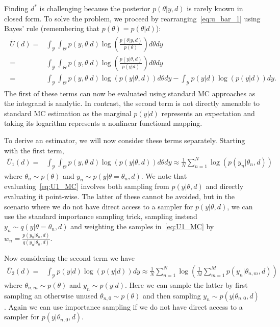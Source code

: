 Finding $d^*$ is challenging because the posterior $p(\theta |y, d)$ is rarely known in closed form.  
To solve the problem, we proceed by rearranging~\eqref{eq:u_bar_1} using Bayes' rule (remembering that
$p(\theta)=p(\theta|d)$):
\begin{align}
\label{eq:u_bar_2}
\begin{split}
\bar{U}(d) = & \int_{\mathcal{Y}}\int_{\Theta} p(y,\theta | d) \log\left(\frac{p(\theta | y, d)}{p(\theta)}\right) d\theta dy \\
=& \int_{\mathcal{Y}}\int_{\Theta} p(y,\theta | d) \log\left(\frac{p(y | \theta, d)}{p(y |d)}\right) d\theta dy \\
=&\int_{\mathcal{Y}}\int_{\Theta} p(y,\theta | d) \log(p(y | \theta, d)) d\theta dy - \int_{\mathcal{Y}} p(y | d) \log(p(y | d))dy.
\end{split}
\end{align}
The first of these terms can now be evaluated using standard MC approaches as the integrand is analytic.  
In contrast, the second term is not directly amenable to standard MC estimation
as the marginal $p(y|d)$ represents an expectation
and taking its logarithm represents a nonlinear functional mapping.  

To derive an estimator, we will now consider these terms separately.  Starting
with the first term,
\begin{align}
\bar{U}_1(d) = &\int_{\mathcal{Y}}\int_{\Theta} p(y,\theta | d) \log(p(y | \theta, d)) d\theta dy
\approx \frac{1}{N} \sum_{n=1}^{N} \log(p(y_n | \theta_n, d)) \label{eq:U1_MC}
\end{align}
where $\theta_n \sim p(\theta)$ and $y_n \sim p(y|\theta=\theta_n, d)$.  We
note that evaluating~\eqref{eq:U1_MC} involves both
sampling from $p(y | \theta, d)$ and directly evaluating it point-wise.
The latter of these cannot be avoided, but in the scenario where we
do not have direct access to a sampler for $p(y | \theta, d)$, we can
use the standard importance sampling trick, sampling instead
$y_n \sim q(y|\theta=\theta_n, d)$ and weighting the samples in~\eqref{eq:U1_MC}
by $w_n = \frac{p(y_n|\theta_n, d)}{q(y_n|\theta_n, d)}$.

Now considering the second term we have
\begin{align}
\bar{U}_2(d) = &\int_{\mathcal{Y}} p(y | d) \log(p(y | d))dy
\approx \frac{1}{N} \sum_{n=1}^{N} \log \left(\frac{1}{M} \sum_{m=1}^{M} p(y_n | \theta_{n,m}, d)\right) \label{eq:U2_MC}
\end{align}
where $\theta_{n,m} \sim p(\theta)$ and $y_n \sim p(y | d)$.  Here we can sample the latter by first sampling an otherwise unused $\theta_{n,0} \sim p(\theta)$ and 
then sampling $y_n \sim p(y | \theta_{n,0}, d)$.  Again we can use importance sampling if 
we do not have direct access to a sampler for $p(y | \theta_{n,0}, d)$.

